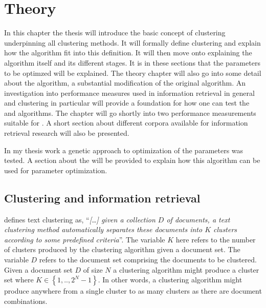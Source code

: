 
\chapter{Theory} %
\label{Theory} %

In this chapter the thesis will introduce the basic concept of clustering underpinning all clustering methods. It will formally define clustering and explain how the \STC algorithm fit into this definition. It will then move onto explaining the \STC algorithm itself and its different stages. It is in these sections that the parameters to be optimzed will be explained. The theory chapter will also go into some detail about the \CTC algorithm, a substantial modification of the original \STC algorithm. An investigation into performance measures used in information retrieval in general and clustering in particular will provide a foundation for how one can test the \STC and \CTC algorithms. The chapter will go shortly into two performance measurements suitable for \CTC. A short section about different corpora available for information retrieval research will also be presented.

In my thesis work a genetic approach to optimization of the parameters was tested. A section about the \GA will be provided to explain how this algorithm can be used for parameter optimization.

\section{Clustering and information retrieval}
\label{Clustering}
\citeauthor[][286]{Baeza-Yates2011a} defines text clustering as, ``\textit{[\dots] given a collection \(D\) of documents, a text clustering method automatically separates these documents into \(K\) clusters according to some predefined criteria}''. The variable \(K\) here refers to the number of clusters produced by the clustering algorithm given a document set. The variable \(D\) refers to the document set comprising the documents to be clustered. Given a document set \(D\) of size \(N\) a clustering algorithm might produce a cluster set where \(K \in \left\{1, .., 2^{N}-1\right\}\). In other words, a clustering algorithm might produce anywhere from a single cluster to as many clusters as there are document combinations.

